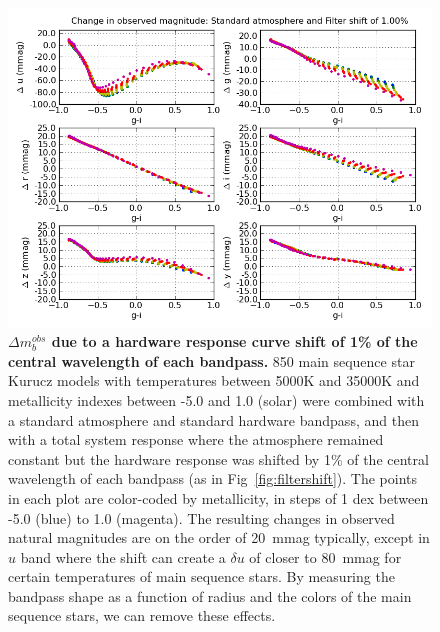\documentclass[12pt,preprint]{aastex}
\begin{document}
\begin{figure}
\centering
\includegraphics[width=6in]{delta_mags_filtershift}
\caption{{\small 
{\bf $\Delta m_b^{obs}$
due to a hardware response curve shift of 1\% of the central
wavelength of each bandpass.}  850 main sequence star Kurucz models with temperatures
between 5000K and 35000K and metallicity indexes between -5.0 and 1.0
(solar) were combined with a standard atmosphere and standard
hardware bandpass, and then with a total system response where the
atmosphere remained constant but the hardware response was shifted by
1\% of the central wavelength of each bandpass (as in
Fig~\ref{fig:filtershift}). The points in each plot are color-coded by metallicity, in
steps of 1 dex between -5.0 (blue) to 1.0 (magenta). The resulting
changes in observed 
natural magnitudes are on the order of
20~mmag typically, except in $u$ band where the shift can create a
$\delta u$ of closer to 80~mmag for certain temperatures of main sequence
stars. By measuring the bandpass shape as a function of radius and the
colors of the main sequence stars, we can remove these effects.} }
\label{fig:dmag_filtershift}
\end{figure}
\end{document}
